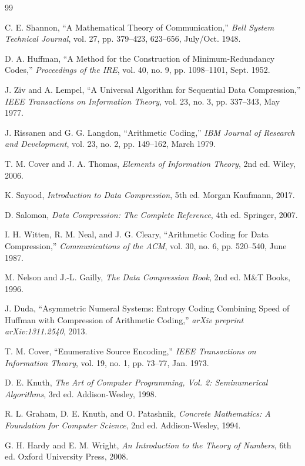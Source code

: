 \documentclass[10pt, conference]{IEEEtran}
\begin{document}
\begin{thebibliography}{99}

C. E. Shannon, ``A Mathematical Theory of Communication,'' \textit{Bell System Technical Journal}, vol. 27, pp. 379--423, 623--656, July/Oct. 1948.

D. A. Huffman, ``A Method for the Construction of Minimum-Redundancy Codes,'' \textit{Proceedings of the IRE}, vol. 40, no. 9, pp. 1098--1101, Sept. 1952.

J. Ziv and A. Lempel, ``A Universal Algorithm for Sequential Data Compression,'' \textit{IEEE Transactions on Information Theory}, vol. 23, no. 3, pp. 337--343, May 1977.

J. Rissanen and G. G. Langdon, ``Arithmetic Coding,'' \textit{IBM Journal of Research and Development}, vol. 23, no. 2, pp. 149--162, March 1979.

T. M. Cover and J. A. Thomas, \textit{Elements of Information Theory}, 2nd ed. Wiley, 2006.

K. Sayood, \textit{Introduction to Data Compression}, 5th ed. Morgan Kaufmann, 2017.

D. Salomon, \textit{Data Compression: The Complete Reference}, 4th ed. Springer, 2007.

I. H. Witten, R. M. Neal, and J. G. Cleary, ``Arithmetic Coding for Data Compression,'' \textit{Communications of the ACM}, vol. 30, no. 6, pp. 520--540, June 1987.

M. Nelson and J.-L. Gailly, \textit{The Data Compression Book}, 2nd ed. M\&T Books, 1996.

J. Duda, ``Asymmetric Numeral Systems: Entropy Coding Combining Speed of Huffman with Compression of Arithmetic Coding,'' \textit{arXiv preprint arXiv:1311.2540}, 2013.

T. M. Cover, ``Enumerative Source Encoding,'' \textit{IEEE Transactions on Information Theory}, vol. 19, no. 1, pp. 73--77, Jan. 1973.

D. E. Knuth, \textit{The Art of Computer Programming, Vol. 2: Seminumerical Algorithms}, 3rd ed. Addison-Wesley, 1998.

R. L. Graham, D. E. Knuth, and O. Patashnik, \textit{Concrete Mathematics: A Foundation for Computer Science}, 2nd ed. Addison-Wesley, 1994.

G. H. Hardy and E. M. Wright, \textit{An Introduction to the Theory of Numbers}, 6th ed. Oxford University Press, 2008.


\end{thebibliography}
\end{document}

